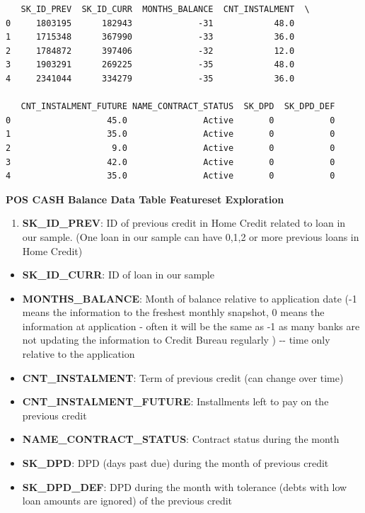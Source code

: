 \documentclass[11pt]{article}
\providecommand{\tightlist}{%
      \setlength{\itemsep}{0pt}\setlength{\parskip}{0pt}}
\begin{document}
    
    \begin{verbatim}
   SK_ID_PREV  SK_ID_CURR  MONTHS_BALANCE  CNT_INSTALMENT  \
0     1803195      182943             -31            48.0   
1     1715348      367990             -33            36.0   
2     1784872      397406             -32            12.0   
3     1903291      269225             -35            48.0   
4     2341044      334279             -35            36.0   

   CNT_INSTALMENT_FUTURE NAME_CONTRACT_STATUS  SK_DPD  SK_DPD_DEF  
0                   45.0               Active       0           0  
1                   35.0               Active       0           0  
2                    9.0               Active       0           0  
3                   42.0               Active       0           0  
4                   35.0               Active       0           0  
    \end{verbatim}

    
    \textbf{POS CASH Balance Data Table Featureset Exploration}

\begin{enumerate}
\def\labelenumi{\arabic{enumi}.}
\tightlist
\item
  \textbf{SK\_ID\_PREV}: ID of previous credit in Home Credit related to
  loan in our sample. (One loan in our sample can have 0,1,2 or more
  previous loans in Home Credit)\\
\end{enumerate}

\begin{itemize}
\tightlist
\item
  \textbf{SK\_ID\_CURR}: ID of loan in our sample\\
\item
  \textbf{MONTHS\_BALANCE}: Month of balance relative to application
  date (-1 means the information to the freshest monthly snapshot, 0
  means the information at application - often it will be the same as -1
  as many banks are not updating the information to Credit Bureau
  regularly ) -\/- time only relative to the application
\item
  \textbf{CNT\_INSTALMENT}: Term of previous credit (can change over
  time)\\
\item
  \textbf{CNT\_INSTALMENT\_FUTURE}: Installments left to pay on the
  previous credit\\
\item
  \textbf{NAME\_CONTRACT\_STATUS}: Contract status during the month\\
\item
  \textbf{SK\_DPD}: DPD (days past due) during the month of previous
  credit\\
\item
  \textbf{SK\_DPD\_DEF}: DPD during the month with tolerance (debts with
  low loan amounts are ignored) of the previous credit
\end{itemize}
\end{document}
